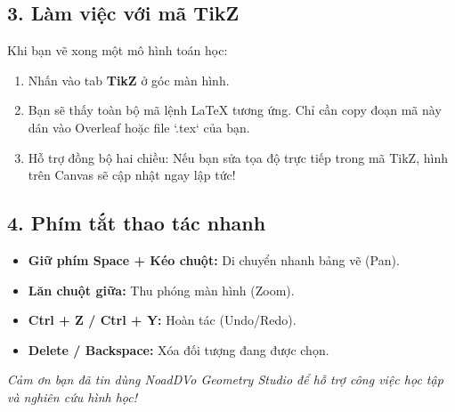 \documentclass[12pt,a4paper]{article}
\begin{document}
\subsection*{3. Làm việc với mã TikZ}
Khi bạn vẽ xong một mô hình toán học:
\begin{enumerate}
    \item Nhấn vào tab \textbf{TikZ} ở góc màn hình.
    \item Bạn sẽ thấy toàn bộ mã lệnh LaTeX tương ứng. Chỉ cần copy đoạn mã này dán vào Overleaf hoặc file `.tex` của bạn.
    \item Hỗ trợ đồng bộ hai chiều: Nếu bạn sửa tọa độ trực tiếp trong mã TikZ, hình trên Canvas sẽ cập nhật ngay lập tức!
\end{enumerate}

\subsection*{4. Phím tắt thao tác nhanh}
\begin{itemize}[label=\textbullet]
    \item \textbf{Giữ phím Space + Kéo chuột:} Di chuyển nhanh bảng vẽ (Pan).
    \item \textbf{Lăn chuột giữa:} Thu phóng màn hình (Zoom).
    \item \textbf{Ctrl + Z / Ctrl + Y:} Hoàn tác (Undo/Redo).
    \item \textbf{Delete / Backspace:} Xóa đối tượng đang được chọn.
\end{itemize}

\vspace{1cm}
\begin{center}
    \textit{Cảm ơn bạn đã tin dùng NoadDVo Geometry Studio để hỗ trợ công việc học tập và nghiên cứu hình học!}
\end{center}
\end{document}
